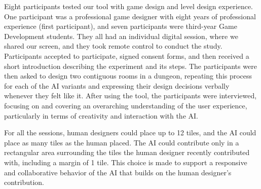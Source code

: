 




Eight participants tested our tool with game design and level design experience. One participant was a professional game designer with eight years of professional experience (first participant), and seven participants were third-year Game Development students. They all had an individual digital session, where we shared our screen, and they took remote control to conduct the study. Participants accepted to participate, signed consent forms, and then received a short introduction describing the experiment and its steps. The participants were then asked to design two contiguous rooms in a dungeon, repeating this process for each of the AI variants and expressing their design decisions verbally whenever they felt like it. After using the tool, the participants were interviewed, focusing on and covering an overarching understanding of the user experience, particularly in terms of creativity and interaction with the AI.


For all the sessions, human designers could place up to 12 tiles, and the AI could place as many tiles as the human placed. The AI could contribute only in a rectangular area surrounding the tiles the human designer recently contributed with, including a margin of 1 tile. This choice is made to support a responsive and collaborative behavior of the AI that builds on the human designer's contribution.



